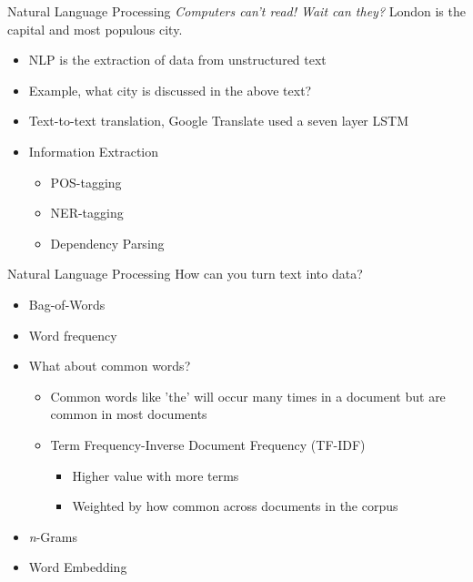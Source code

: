 \documentclass[10pt]{beamer}
\begin{document}
\begin{frame}{Natural Language Processing}
\emph{Computers can't read! Wait can they?}
London is the capital and most populous city.
	\begin{itemize}
		\item NLP is the extraction of data from unstructured text
		\item Example, what city is discussed in the above text?
		\item Text-to-text translation, Google Translate used a seven layer LSTM
		\item Information Extraction
			\begin{itemize}
				\item POS-tagging
				\item NER-tagging
				\item Dependency Parsing
			\end{itemize}
	\end{itemize}
\end{frame}

\begin{frame}{Natural Language Processing}
How can you turn text into data?
	\begin{itemize}
		\item Bag-of-Words
		\item Word frequency
		\item What about common words? 
		\begin{itemize}
			\item Common words like 'the' will occur many times in a document but are common in most documents
			\item Term Frequency-Inverse Document Frequency (TF-IDF)
				\begin{itemize}
				\item Higher value with more terms
				\item Weighted by how common across documents in the corpus
				\end{itemize}
		\end{itemize}
		\item \emph{n}-Grams  \href{https://books.google.com/ngrams}{}
		\item Word Embedding
	\end{itemize}
\end{frame}
\end{document}
